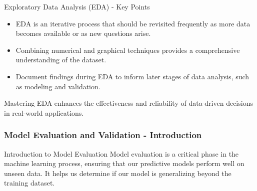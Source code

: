 \documentclass[aspectratio=169]{beamer}
\begin{document}
\begin{frame}[fragile]{Exploratory Data Analysis (EDA) - Key Points}
    \begin{itemize}
        \item EDA is an iterative process that should be revisited frequently as more data becomes available or as new questions arise.
        \item Combining numerical and graphical techniques provides a comprehensive understanding of the dataset.
        \item Document findings during EDA to inform later stages of data analysis, such as modeling and validation.
    \end{itemize}
    Mastering EDA enhances the effectiveness and reliability of data-driven decisions in real-world applications.
\end{frame}

\begin{frame}[fragile]
    \frametitle{Model Evaluation and Validation - Introduction}
    \begin{block}{Introduction to Model Evaluation}
        Model evaluation is a critical phase in the machine learning process, ensuring that our predictive models perform well on unseen data. It helps us determine if our model is generalizing beyond the training dataset.
    \end{block}
\end{frame}
\end{document}
